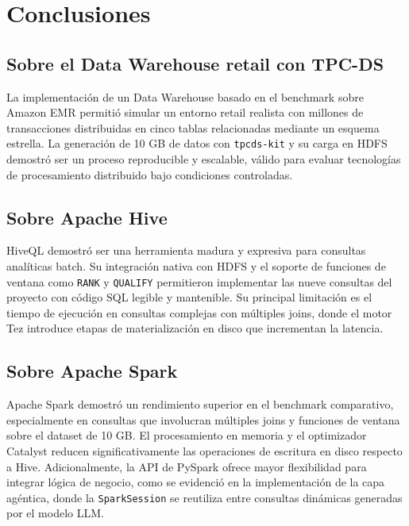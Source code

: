 
\section{Conclusiones}

\subsection{Sobre el Data Warehouse retail con TPC-DS}

La implementación de un Data Warehouse basado en el benchmark \tpcds{} sobre Amazon EMR
permitió simular un entorno retail realista con millones de transacciones distribuidas
en cinco tablas relacionadas mediante un esquema estrella. La generación de 10 GB de datos
con \texttt{tpcds-kit} y su carga en HDFS demostró ser un proceso reproducible y
escalable, válido para evaluar tecnologías de procesamiento distribuido bajo condiciones
controladas.

\subsection{Sobre Apache Hive}

HiveQL demostró ser una herramienta madura y expresiva para consultas analíticas batch.
Su integración nativa con HDFS y el soporte de funciones de ventana como \texttt{RANK}
y \texttt{QUALIFY} permitieron implementar las nueve consultas del proyecto con código
SQL legible y mantenible. Su principal limitación es el tiempo de ejecución en consultas
complejas con múltiples joins, donde el motor Tez introduce etapas de materialización
en disco que incrementan la latencia.

\subsection{Sobre Apache Spark}

Apache Spark demostró un rendimiento superior en el benchmark comparativo, especialmente
en consultas que involucran múltiples joins y funciones de ventana sobre el dataset de
10 GB. El procesamiento en memoria y el optimizador Catalyst reducen significativamente
las operaciones de escritura en disco respecto a Hive. Adicionalmente, la API de PySpark
ofrece mayor flexibilidad para integrar lógica de negocio, como se evidenció en la
implementación de la capa agéntica, donde la \texttt{SparkSession} se reutiliza
entre consultas dinámicas generadas por el modelo LLM.

